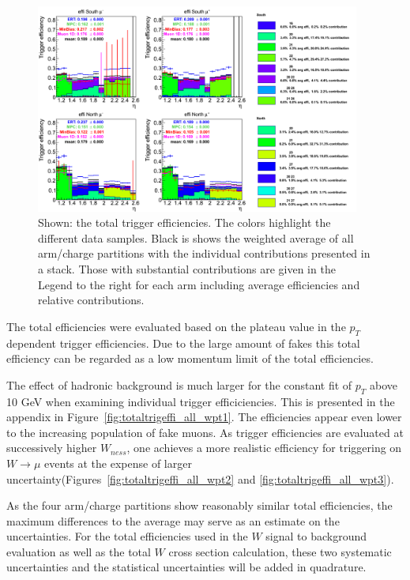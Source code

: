 \begin{figure}[h!]
  \centering
  \includegraphics[width=0.95\textwidth]{./figures/totaltrigeffi13_all_wpt0.png}
  \caption{
    Shown: the total trigger efficiencies. The colors highlight the different
    data samples. Black is shows the weighted average of all arm/charge
    partitions with the individual contributions presented in a stack.  Those
    with substantial contributions are given in the Legend to the right for each
    arm including average efficiencies and relative contributions.  
  }
  \label{fig:totaltrigeffi_all_wpt0} 
\end{figure}

The total efficiencies were evaluated based on the plateau value in the $p_T$
dependent trigger efficiencies. Due to the large amount of fakes this total
efficiency can be regarded as a low momentum limit of the total efficiencies.

The effect of hadronic background is much larger for the constant fit of $p_T$
above 10 GeV when examining individual trigger efficiciencies. This is presented
in the appendix in Figure~\ref{fig:totaltrigeffi_all_wpt1}. The efficiencies
appear even lower to the increasing population of fake muons. As trigger
efficiencies are evaluated at successively higher $W_{ness}$, one achieves a
more realistic efficiency for triggering on $W\rightarrow\mu$ events at the
expense of larger uncertainty(Figures~\ref{fig:totaltrigeffi_all_wpt2} and
\ref{fig:totaltrigeffi_all_wpt3}). 

As the four arm/charge partitions show reasonably similar total efficiencies,
the maximum differences to the average may serve as an estimate on the
uncertainties. For the total efficiencies used in the $W$ signal to background
evaluation as well as the total $W$ cross section calculation, these two
systematic uncertainties and the statistical uncertainties will be added in
quadrature. 

